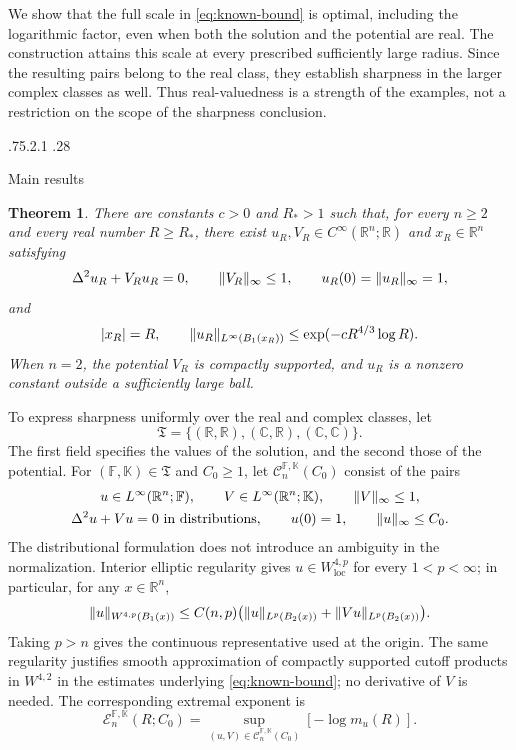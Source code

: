 \documentclass[11pt,a4paper,leqno]{amsart}
\makeatletter
\numberwithin{equation}{section}
\theoremstyle{landisplain}
\newtheorem{theorem}{Theorem}[section]
\theoremstyle{landisdefinition}
\theoremstyle{landisremark}
\newcommand{\R}{\mathbb R}
\newcommand{\C}{\mathbb C}
\DeclarePairedDelimiter{\norm}{\lVert}{\rVert}
\renewcommand\subsection{\@startsection{subsection}{2}{\z@}%
  {.75\baselineskip \@plus .2\baselineskip \@minus .1\baselineskip}%
  {.28\baselineskip}%
  {\normalfont\bfseries\raggedright}}
\makeatother
\begin{document}
We show that the full scale in \eqref{eq:known-bound} is optimal,
including the logarithmic factor, even when both the solution and
the potential are real. The construction attains this scale at
every prescribed sufficiently large radius. Since the resulting
pairs belong to the real class, they establish sharpness in the
larger complex classes as well. Thus real-valuedness is a strength
of the examples, not a restriction on the scope of the sharpness
conclusion.

\subsection{Main results}

\begin{theorem}\label{thm:main}
There are constants $c>0$ and $R_*>1$ such that, for every $n\ge2$
and every real number $R\ge R_*$, there exist
$u_R,V_R\in C^\infty(\R^n;\R)$ and $x_R\in\R^n$ satisfying
\begin{equation}\label{eq:normalized-examples}
 \Delta^2u_R+V_Ru_R=0,\qquad
 \norm{V_R}_\infty\le1,\qquad
 u_R(0)=\norm{u_R}_\infty=1,
\end{equation}
and
\begin{equation}\label{eq:example-smallness}
 |x_R|=R,\qquad
 \norm{u_R}_{L^\infty(B_1(x_R))}
 \le\exp(-cR^{4/3}\log R).
\end{equation}
When $n=2$, the potential $V_R$ is compactly supported, and $u_R$
is a nonzero constant outside a sufficiently large ball.
\end{theorem}

To express sharpness uniformly over the real and complex classes,
let
\[
 \mathfrak T=\{(\R,\R),(\C,\R),(\C,\C)\}.
\]
The first field specifies the values of the solution, and the
second those of the potential. For
$(\mathbb F,\mathbb K)\in\mathfrak T$ and $C_0\ge1$, let
$\mathcal C_n^{\mathbb F,\mathbb K}(C_0)$ consist of the pairs
\begin{equation}\label{eq:class}
 \begin{gathered}
 u\in L^\infty(\R^n;\mathbb F),\qquad
 V\in L^\infty(\R^n;\mathbb K),\qquad \norm V_\infty\le1,\\
 \Delta^2u+Vu=0\ \text{in distributions},\qquad
 u(0)=1,\qquad \norm u_\infty\le C_0.
 \end{gathered}
\end{equation}
The distributional formulation does not introduce an ambiguity
in the normalization. Interior elliptic regularity gives
$u\in W^{4,p}_{\mathrm{loc}}$ for every $1<p<\infty$; in
particular, for any $x\in\R^n$,
\[
 \norm u_{W^{4,p}(B_1(x))}
 \le C(n,p)\bigl(\norm u_{L^p(B_2(x))}
                 +\norm{Vu}_{L^p(B_2(x))}\bigr).
\]
Taking $p>n$ gives the continuous representative used at the
origin. The same regularity justifies smooth approximation of
compactly supported cutoff products in $W^{4,2}$ in the estimates
underlying \eqref{eq:known-bound}; no derivative of $V$ is needed.
The corresponding extremal exponent is
\begin{equation}\label{eq:extremal}
 \mathcal E_n^{\mathbb F,\mathbb K}(R;C_0)
 =\sup_{(u,V)\in\mathcal C_n^{\mathbb F,\mathbb K}(C_0)}
      [-\log m_u(R)].
\end{equation}
\end{document}
